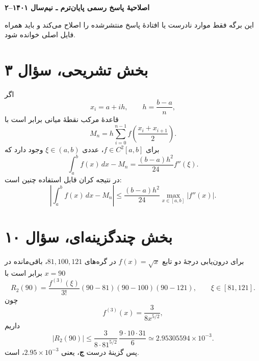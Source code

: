 \documentclass[12pt]{article}
\begin{document}
\begin{center}
  {\Large\textbf{اصلاحیهٔ پاسخ رسمی پایان‌ترم ـ نیم‌سال ۱۴۰۱--۲}}
\end{center}

این برگه فقط موارد نادرست یا افتادهٔ پاسخ منتشرشده را اصلاح می‌کند و باید همراه فایل اصلی خوانده شود.

\section*{بخش تشریحی، سؤال ۳}
اگر
\[
  x_i=a+ih,\qquad h=\frac{b-a}{n},
\]
قاعدهٔ مرکب نقطهٔ میانی برابر است با
\[
  M_n
  =h\sum_{i=0}^{n-1}
  f\!\left(\frac{x_i+x_{i+1}}2\right).
\]
برای \(f\in C^2[a,b]\)، عددی \(\xi\in(a,b)\) وجود دارد که
\[
  \int_a^b f(x)\,dx-M_n
  =\frac{(b-a)h^2}{24}f''(\xi).
\]
در نتیجه کران قابل استفاده چنین است:
\[
  \left|\int_a^b f(x)\,dx-M_n\right|
  \leq
  \frac{(b-a)h^2}{24}
  \max_{x\in[a,b]}|f''(x)|.
\]

\section*{بخش چندگزینه‌ای، سؤال ۱۰}
برای درون‌یابی درجهٔ دو تابع
\(f(x)=\sqrt{x}\)
در گره‌های \(81,100,121\)، باقی‌مانده در \(x=90\) برابر است با
\[
 R_2(90)
 =\frac{f^{(3)}(\xi)}{3!}
 (90-81)(90-100)(90-121),
 \qquad \xi\in[81,121].
\]
چون
\[
  f^{(3)}(x)=\frac{3}{8x^{5/2}},
\]
داریم
\[
 |R_2(90)|
 \leq
 \frac{3}{8\cdot81^{5/2}}\,
 \frac{9\cdot10\cdot31}{6}
 \simeq 2.95305594\times10^{-3}.
\]
پس گزینهٔ درست \textbf{ج}، یعنی
\(2.95\times10^{-3}\)،
است.
\end{document}
